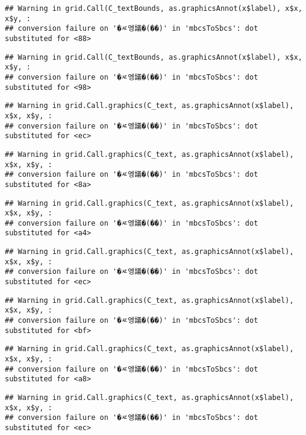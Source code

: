 \documentclass[
]{article}
\begin{document}
\begin{verbatim}
## Warning in grid.Call(C_textBounds, as.graphicsAnnot(x$label), x$x, x$y, :
## conversion failure on '�ㅼ엥議�(��)' in 'mbcsToSbcs': dot substituted for <88>
\end{verbatim}

\begin{verbatim}
## Warning in grid.Call(C_textBounds, as.graphicsAnnot(x$label), x$x, x$y, :
## conversion failure on '�ㅼ엥議�(��)' in 'mbcsToSbcs': dot substituted for <98>
\end{verbatim}

\begin{verbatim}
## Warning in grid.Call.graphics(C_text, as.graphicsAnnot(x$label), x$x, x$y, :
## conversion failure on '�ㅼ엥議�(��)' in 'mbcsToSbcs': dot substituted for <ec>
\end{verbatim}

\begin{verbatim}
## Warning in grid.Call.graphics(C_text, as.graphicsAnnot(x$label), x$x, x$y, :
## conversion failure on '�ㅼ엥議�(��)' in 'mbcsToSbcs': dot substituted for <8a>
\end{verbatim}

\begin{verbatim}
## Warning in grid.Call.graphics(C_text, as.graphicsAnnot(x$label), x$x, x$y, :
## conversion failure on '�ㅼ엥議�(��)' in 'mbcsToSbcs': dot substituted for <a4>
\end{verbatim}

\begin{verbatim}
## Warning in grid.Call.graphics(C_text, as.graphicsAnnot(x$label), x$x, x$y, :
## conversion failure on '�ㅼ엥議�(��)' in 'mbcsToSbcs': dot substituted for <ec>
\end{verbatim}

\begin{verbatim}
## Warning in grid.Call.graphics(C_text, as.graphicsAnnot(x$label), x$x, x$y, :
## conversion failure on '�ㅼ엥議�(��)' in 'mbcsToSbcs': dot substituted for <bf>
\end{verbatim}

\begin{verbatim}
## Warning in grid.Call.graphics(C_text, as.graphicsAnnot(x$label), x$x, x$y, :
## conversion failure on '�ㅼ엥議�(��)' in 'mbcsToSbcs': dot substituted for <a8>
\end{verbatim}

\begin{verbatim}
## Warning in grid.Call.graphics(C_text, as.graphicsAnnot(x$label), x$x, x$y, :
## conversion failure on '�ㅼ엥議�(��)' in 'mbcsToSbcs': dot substituted for <ec>
\end{verbatim}
\end{document}
